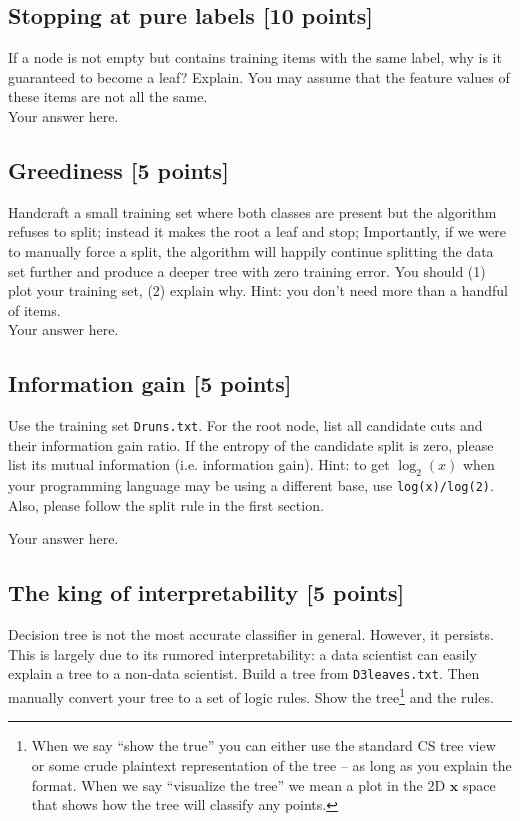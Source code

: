 \documentclass[a4paper]{article}
\theoremstyle{definition}
\def\x{\mathbf x}
\begin{document}
\subsection{Stopping at pure labels [10 points]}
If a node is not empty but contains training items with the same label, why is it guaranteed to become a leaf?  Explain. You may assume that the feature values of these items are not all the same.\\
{\color{blue} Your answer here.}

\subsection{Greediness [5 points]}
Handcraft a small training set where both classes are present but the algorithm refuses to split; instead it makes the root a leaf and stop;
Importantly, if we were to manually force a split, the algorithm will happily continue splitting the data set further and produce a deeper tree with zero training error.
You should (1) plot your training set, (2) explain why.  Hint: you don't need more than a handful of items.\\
{\color{blue} Your answer here.}

\subsection{Information gain [5 points]}
Use the training set {\tt Druns.txt}.  For the root node, list all candidate cuts and their information gain ratio. If the entropy of the candidate split is zero, please list its mutual information (i.e. information gain). Hint: to get $\log_2(x)$ when your programming language may be using a different base, use \verb|log(x)/log(2)|. Also, please follow the split rule in the first section.

{\color{blue} Your answer here.}

\subsection{The king of interpretability [5 points]}
Decision tree is not the most accurate classifier in general.  However, it persists.  This is largely due to its rumored interpretability: a data scientist can easily explain a tree to a non-data scientist.  Build a tree from {\tt D3leaves.txt}.  Then manually convert your tree to a set of logic rules.  Show the tree\footnote{When we say ``show the true'' you can either use the standard CS tree view or some crude plaintext representation of the tree -- as long as you explain the format.  When we say ``visualize the tree'' we mean a plot in the 2D $\x$ space that shows how the tree will classify any points.} and the rules.
\end{document}
